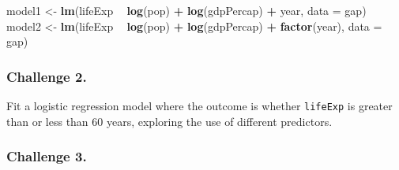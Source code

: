 \documentclass[]{book}
\newenvironment{Shaded}{\begin{snugshade}}{\end{snugshade}}
\newcommand{\DataTypeTok}[1]{\textcolor[rgb]{0.13,0.29,0.53}{#1}}
\newcommand{\DecValTok}[1]{\textcolor[rgb]{0.00,0.00,0.81}{#1}}
\newcommand{\KeywordTok}[1]{\textcolor[rgb]{0.13,0.29,0.53}{\textbf{#1}}}
\newcommand{\NormalTok}[1]{#1}
\newcommand{\OperatorTok}[1]{\textcolor[rgb]{0.81,0.36,0.00}{\textbf{#1}}}
\newcommand{\StringTok}[1]{\textcolor[rgb]{0.31,0.60,0.02}{#1}}
\begin{document}
\begin{Shaded}
\begin{Highlighting}[]
\NormalTok{model1 <-}\StringTok{ }\KeywordTok{lm}\NormalTok{(lifeExp }\OperatorTok{~}\StringTok{ }\KeywordTok{log}\NormalTok{(pop) }\OperatorTok{+}\StringTok{ }\KeywordTok{log}\NormalTok{(gdpPercap) }\OperatorTok{+}\StringTok{ }\NormalTok{year, }\DataTypeTok{data =}\NormalTok{ gap)}
\NormalTok{model2 <-}\StringTok{ }\KeywordTok{lm}\NormalTok{(lifeExp }\OperatorTok{~}\StringTok{ }\KeywordTok{log}\NormalTok{(pop) }\OperatorTok{+}\StringTok{ }\KeywordTok{log}\NormalTok{(gdpPercap) }\OperatorTok{+}\StringTok{ }\KeywordTok{factor}\NormalTok{(year), }\DataTypeTok{data =}\NormalTok{ gap)}
\end{Highlighting}
\end{Shaded}

\hypertarget{challenge-2.-10}{%
\subsubsection*{Challenge 2.}\label{challenge-2.-10}}

Fit a logistic regression model where the outcome is whether \texttt{lifeExp} is greater than or less than 60 years, exploring the use of different predictors.

\begin{Shaded}
\end{Shaded}

\hypertarget{challenge-3.-7}{%
\subsubsection*{Challenge 3.}\label{challenge-3.-7}}
\end{document}
